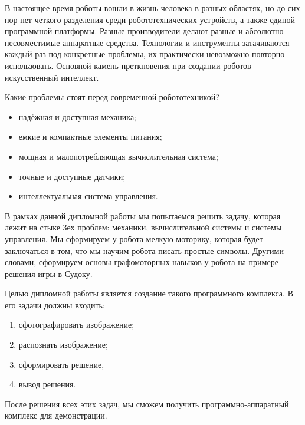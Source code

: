 \Introduction

В настоящее время роботы вошли в жизнь человека в разных областях, но до сих пор нет четкого разделения среди робототехнических устройств, а также единой программной платформы. Разные производители делают разные и абсолютно несовместимые аппаратные средства. Технологии и инструменты затачиваются каждый раз под конкретные проблемы, их практически невозможно повторно использовать. Основной камень преткновения при создании роботов — искусственный интеллект. 

Какие проблемы стоят перед современной робототехникой?

\begin{itemize}
\item надёжная и доступная механика;
\item емкие и компактные элементы питания;
\item мощная и малопотребляющая вычислительная система;
\item точные и доступные датчики;
\item интеллектуальная система управления.
\end{itemize}

В рамках данной дипломной работы мы попытаемся решить задачу, которая лежит на стыке 3ех проблем: механики, вычислительной системы и системы управления.
Мы сформируем у робота мелкую моторику, которая будет заключаться в том, что мы научим робота писать простые символы. Другими словами, сформируем основы графомоторных навыков у робота на примере решения игры в Судоку.

Целью дипломной работы является создание такого программного комплекса. В его задачи должны входить:
\begin{enumerate}
\item сфотографировать изображение;
\item распознать изображение;
\item сформировать решение,
\item вывод решения.
\end{enumerate}

После решения всех этих задач, мы сможем получить программно-аппаратный комплекс для демонстрации.

